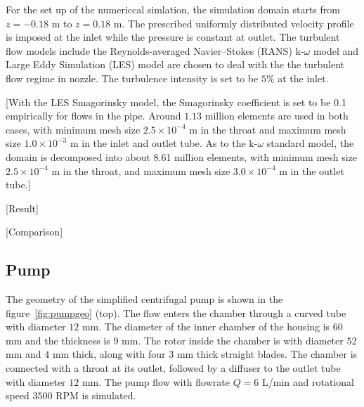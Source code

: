 For the set up of the numericcal simlation, the simulation domain starts from $z=-0.18$ m to $z=0.18$ m. The prescribed uniformly distributed velocity profile is imposed at the inlet while the pressure is constant at outlet. The turbulent flow models include the Reynolds-averaged Navier–Stokes (RANS) k-$\omega$ model and Large Eddy Simulation (LES) model are chosen to deal with the the turbulent flow regime in nozzle. The turbulence intensity is set to be $5$\% at the inlet. 

[With the LES Smagorinsky model, the Smagorinsky coefficient is set to be 0.1 empirically for flows in the pipe. Around $1.13$ million elements are used in both cases, with minimum mesh size $2.5\times10^{-4}$ m in the throat and maximum mesh size $1.0\times10^{-3}$ m in the inlet and outlet tube. As to the k-$\omega$ standard model, the domain is decomposed into about 8.61 million elements, with minimum mesh size $2.5\times10^{-4}$ m in the throat, and maximum mesh size $3.0\times10^{-4}$ m in the outlet tube.]  

[Result]

[Comparison]

\subsection{Pump}

The geometry of the simplified centrifugal pump is shown in the figure~\ref{fig:pumpgeo} (top). The flow enters the chamber through a curved tube with diameter $12$ mm. The diameter of the inner chamber of the housing is $60$ mm and the thickness is $9$ mm. The rotor inside the chamber is with diameter $52$ mm and $4$ mm thick, along with four $3$ mm thick straight blades. The chamber is connected with a throat at its outlet, followed by a diffuser to the outlet tube with diameter $12$ mm. The pump flow with flowrate $Q = 6$ L/min and rotational speed $3500$ RPM is simulated. 

